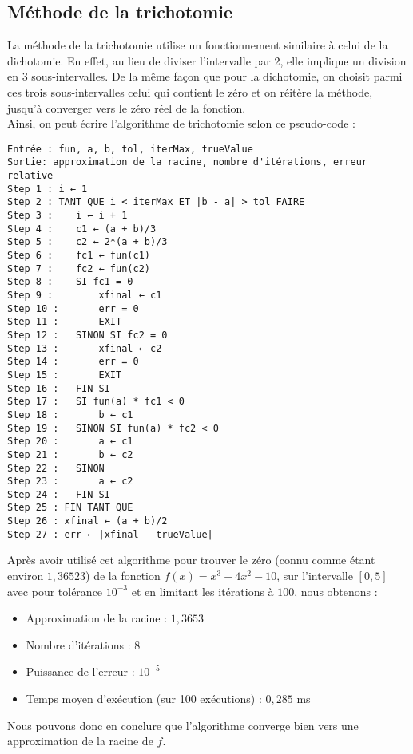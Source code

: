 \documentclass[12pt]{article}
\begin{document}
\subsection{Méthode de la trichotomie}
\label{ref:trichotomie}
\noindent La méthode de la trichotomie utilise un fonctionnement similaire à celui de la dichotomie. En effet, au lieu de diviser l'intervalle par 2, elle implique un division en 3 sous-intervalles. De la même façon que pour la dichotomie, on choisit parmi ces trois sous-intervalles celui qui contient le zéro et on réitère la méthode, jusqu'à converger vers le zéro réel de la fonction.\\
Ainsi, on peut écrire l'algorithme de trichotomie selon ce pseudo-code :
\begin{verbatim}
Entrée : fun, a, b, tol, iterMax, trueValue
Sortie: approximation de la racine, nombre d'itérations, erreur relative
Step 1 : i ← 1
Step 2 : TANT QUE i < iterMax ET |b - a| > tol FAIRE
Step 3 :    i ← i + 1
Step 4 :    c1 ← (a + b)/3
Step 5 :    c2 ← 2*(a + b)/3
Step 6 :    fc1 ← fun(c1)
Step 7 :    fc2 ← fun(c2)
Step 8 :    SI fc1 = 0
Step 9 :        xfinal ← c1
Step 10 :       err = 0
Step 11 :       EXIT
Step 12 :   SINON SI fc2 = 0
Step 13 :       xfinal ← c2
Step 14 :       err = 0
Step 15 :       EXIT
Step 16 :   FIN SI
Step 17 :   SI fun(a) * fc1 < 0
Step 18 :       b ← c1
Step 19 :   SINON SI fun(a) * fc2 < 0
Step 20 :       a ← c1
Step 21 :       b ← c2
Step 22 :   SINON
Step 23 :       a ← c2
Step 24 :   FIN SI
Step 25 : FIN TANT QUE
Step 26 : xfinal ← (a + b)/2
Step 27 : err ← |xfinal - trueValue|
\end{verbatim}
\noindent Après avoir utilisé cet algorithme pour trouver le zéro (connu comme étant environ $1,36523$) de la fonction $f(x) = x^3 + 4x^2 -10$, sur l'intervalle $[0,5]$ avec pour tolérance $10^{-3}$ et en limitant les itérations à $100$, nous obtenons :
\begin{itemize}
    \item Approximation de la racine : $1,3653$
    \item Nombre d'itérations : $8$
    \item Puissance de l'erreur : $10^{-5}$
    \item Temps moyen d'exécution (sur 100 exécutions) : $0,285$ ms
\end{itemize}
Nous pouvons donc en conclure que l'algorithme converge bien vers une approximation de la racine de $f$.


\end{document}
